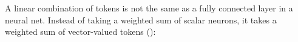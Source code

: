 A linear combination of tokens is not the same as a fully connected layer in a neural net. Instead of taking a weighted sum of scalar neurons, it takes a weighted sum of vector-valued tokens (\fig{\ref{fig:transformers:lin_bomb_neurons_vs_tokens}}): %
